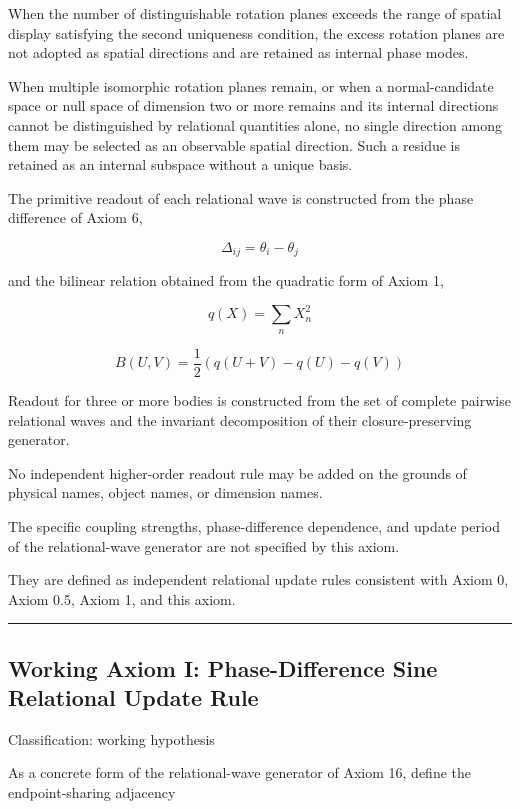 \documentclass[
  a4paper,
]{article}
\begin{document}
When the number of distinguishable rotation planes exceeds the range of
spatial display satisfying the second uniqueness condition, the excess
rotation planes are not adopted as spatial directions and are retained
as internal phase modes.

When multiple isomorphic rotation planes remain, or when a
normal-candidate space or null space of dimension two or more remains
and its internal directions cannot be distinguished by relational
quantities alone, no single direction among them may be selected as an
observable spatial direction. Such a residue is retained as an internal
subspace without a unique basis.

The primitive readout of each relational wave is constructed from the
phase difference of Axiom 6,

\[
\Delta_{ij}=\theta_i-\theta_j
\]

and the bilinear relation obtained from the quadratic form of Axiom 1,

\[
q(X)=\sum_n X_n^2
\]

\[
B(U,V)
=\frac{1}{2}\left(q(U+V)-q(U)-q(V)\right)
\]

Readout for three or more bodies is constructed from the set of complete
pairwise relational waves and the invariant decomposition of their
closure-preserving generator.

No independent higher-order readout rule may be added on the grounds of
physical names, object names, or dimension names.

The specific coupling strengths, phase-difference dependence, and update
period of the relational-wave generator are not specified by this axiom.

They are defined as independent relational update rules consistent with
Axiom 0, Axiom 0.5, Axiom 1, and this axiom.

\begin{center}\rule{0.5\linewidth}{0.5pt}\end{center}

\subsection{Working Axiom I: Phase-Difference Sine Relational Update
Rule}\label{working-axiom-i-phase-difference-sine-relational-update-rule}

Classification: working hypothesis

As a concrete form of the relational-wave generator of Axiom 16, define
the endpoint-sharing adjacency
\end{document}
